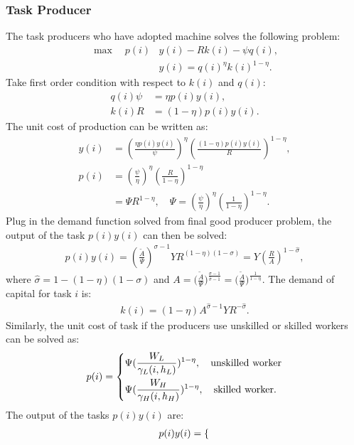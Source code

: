 \documentclass[12pt]{article}
\begin{document}
\begin{appendices}
\subsubsection*{Task Producer}
The task producers who have adopted machine solves the following problem:
\begin{align*}
\max \quad  p(i)&y(i)-Rk(i)-\psi q(i), \\
&y(i) = q(i)^{\eta}k(i)^{1-\eta}.
\end{align*}
Take first order condition with respect to $k(i)$ and $q(i)$:
\begin{align*}
q(i)\psi &= \eta p(i)y(i), \\
k(i)R &= (1-\eta)p(i)y(i).
\end{align*}
The unit cost of production can be written as:
\begin{align*}
y(i) &= (\frac{\eta p(i)y(i)}{\psi})^{\eta}(\frac{(1-\eta)p(i)y(i)}{R})^{1-\eta}, \\
p(i) &= (\frac{\psi}{\eta})^{\eta} (\frac{R}{1-\eta})^{1-\eta} \\
 	  &= \Psi R^{1-\eta}, \quad \Psi =  (\frac{\psi}{\eta})^{\eta} (\frac{1}{1-\eta})^{1-\eta}.
\end{align*}
Plug in the demand function solved from final good producer problem, the output of the task $p(i)y(i)$ can then be solved: 
\begin{align*}
p(i)y(i) = (\frac{\tilde{A}}{\Psi})^{\sigma-1}YR^{(1-\eta)(1-\sigma)} = Y(\frac{R}{A})^{1-\hat{\sigma}},
\end{align*}
where $\hat{\sigma} = 1-(1-\eta)(1-\sigma)$ and $A = \Big(\frac{\tilde{A}}{\Psi}\Big)^{\frac{\sigma-1}{\hat{\sigma}-1}}  = \Big(\frac{\tilde{A}}{\Psi}\Big)^{\frac{1}{1-\eta}}$. 
The demand of capital for task $i$ is: 
\begin{align*}
k(i) = (1-\eta)A^{\hat{\sigma}-1}YR^{-\hat{\sigma}}.
\end{align*}
Similarly, the unit cost of task if the producers use unskilled or skilled workers can be solved as:
\begin{align*}
p(i) =
\begin{dcases}
\Psi(\frac{W_L}{\gamma_L(i,h_L)})^{1-\eta}, \quad \text{unskilled worker}  \\
\Psi(\frac{W_H}{\gamma_H(i,h_H)})^{1-\eta}, \quad \text{skilled worker}.
\end{dcases}
\end{align*}
The output of the tasks $p(i)y(i)$ are:
\begin{align*}
p(i)y(i) =
\begin{dcases}

\end{dcases}
\end{align*}
\end{appendices}
\end{document}
